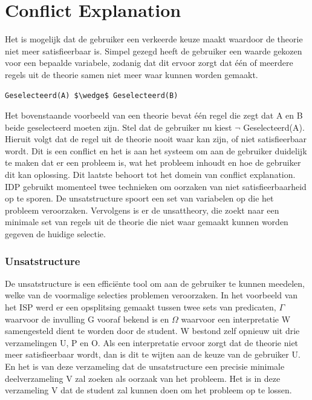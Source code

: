 \section{Conflict Explanation}
Het is mogelijk dat de gebruiker een verkeerde keuze maakt waardoor de theorie niet meer satisfieerbaar is. Simpel gezegd heeft de gebruiker een waarde gekozen voor een bepaalde variabele, zodanig dat dit ervoor zorgt dat \'{e}\'{e}n of meerdere regels uit de theorie samen niet meer waar kunnen worden gemaakt.
\lstset{basicstyle=\scriptsize}
\begin{lstlisting}[mathescape]
Geselecteerd(A) $\wedge$ Geselecteerd(B)
\end{lstlisting}
Het bovenstaande voorbeeld van een theorie bevat \'{e}\'{e}n regel die zegt dat A en B beide geselecteerd moeten zijn. Stel dat de gebruiker nu kiest $\neg$ Geselecteerd(A). Hieruit volgt dat de regel uit de theorie nooit waar kan zijn, of niet satisfieerbaar wordt. Dit is een conflict en het is aan het systeem om aan de gebruiker duidelijk te maken dat er een probleem is, wat het probleem inhoudt en hoe de gebruiker dit kan oplossing. Dit laatste behoort tot het domein van conflict explanation. IDP gebruikt momenteel twee technieken om oorzaken van niet satisfieerbaarheid op te sporen. De unsatstructure spoort een set van variabelen op die het probleem veroorzaken. Vervolgens is er de unsattheory, die zoekt naar een minimale set van regels uit de theorie die niet waar gemaakt kunnen worden gegeven de huidige selectie.

\subsubsection{Unsatstructure}
De unsatstructure is een effici\"{e}nte tool om aan de gebruiker te kunnen meedelen, welke van de voormalige selecties problemen veroorzaken. In het voorbeeld van het ISP werd er een opsplitsing gemaakt tussen twee sets van predicaten, $\Gamma$ waarvoor de invulling G vooraf bekend is en $\Omega$ waarvoor een interpretatie W samengesteld dient te worden door de student. W bestond zelf opnieuw uit drie verzamelingen U, P en O. Als een interpretatie ervoor zorgt dat de theorie niet meer satisfieerbaar wordt, dan is dit te wijten aan de keuze van de gebruiker U. En het is van deze verzameling dat de unsatstructure een precisie minimale deelverzameling V zal zoeken als oorzaak van het probleem. Het is in deze verzameling V dat de student zal kunnen doen om het probleem op te lossen. 

